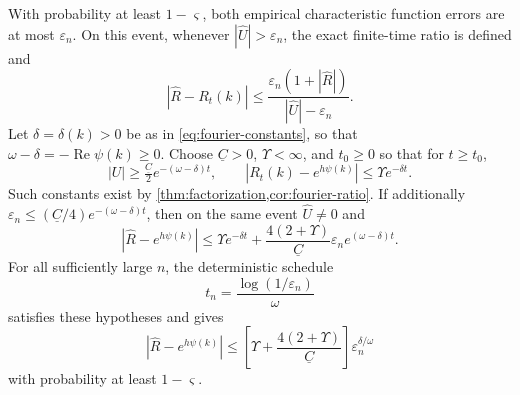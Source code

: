 \begin{proposition}\label{prop:ratio-sampling}
With probability at least $1-\varsigma$, both empirical characteristic
function errors are at most $\varepsilon_n$. On this event, whenever
$|\widehat U|>\varepsilon_n$, the exact finite-time ratio is defined and
\begin{equation}
 |\widehat R-R_t(k)|
 \leq\frac{\varepsilon_n(1+|\widehat R|)}
                  {|\widehat U|-\varepsilon_n}.
 \label{eq:observable-certificate}
\end{equation}
Let $\delta=\delta(k)>0$ be as in \eqref{eq:fourier-constants}, so that
$\omega-\delta=-\operatorname{Re}\psi(k)\geq0$. Choose
$\underline C>0$, $\Upsilon<\infty$, and $t_0\geq0$ so that
for $t\geq t_0$,
\begin{equation}
 |U|\geq\tfrac{\underline C}2e^{-(\omega-\delta)t},\qquad
 |R_t(k)-e^{h\psi(k)}|\leq\Upsilon e^{-\delta t}.
 \label{eq:sampling-signal}
\end{equation}
Such constants exist by \cref{thm:factorization,cor:fourier-ratio}.
If additionally $\varepsilon_n\leq(\underline C/4)e^{-(\omega-\delta)t}$,
then on the same event $\widehat U\ne0$ and
\begin{equation}
 |\widehat R-e^{h\psi(k)}|
 \leq\Upsilon e^{-\delta t}
  +\frac{4(2+\Upsilon)}{\underline C}\varepsilon_n e^{(\omega-\delta)t}.
 \label{eq:bias-noise}
\end{equation}
For all sufficiently large $n$, the deterministic schedule
\begin{equation}
 t_n=\frac{\log(1/\varepsilon_n)}\omega
 \label{eq:observation-time}
\end{equation}
satisfies these hypotheses and gives
\begin{equation}
 |\widehat R-e^{h\psi(k)}|
 \leq\left[\Upsilon+\frac{4(2+\Upsilon)}{\underline C}\right]
              \varepsilon_n^{\delta/\omega}
 \label{eq:balanced-ratio}
\end{equation}
with probability at least $1-\varsigma$.
\end{proposition}

